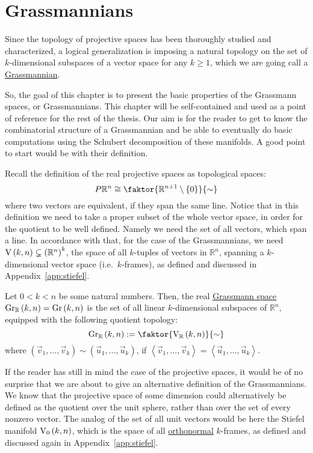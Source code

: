 \chapter{Grassmannians}
Since the topology of projective spaces has been thoroughly studied and characterized, a logical generalization is imposing a natural topology on the set of $k$-dimensional subspaces of a vector space for any $k\geq1$, which we are going call a \ul{Grassmannian}.

So, the goal of this chapter is to present the basic properties of the Grassmann spaces, or Grassmannians. This chapter will be self-contained and used as a point of reference for the rest of the thesis. Our aim is for the reader to get to know the combinatorial structure of a Grassmannian and be able to eventually do basic computations using the Schubert decomposition of these manifolds. A good point to start would be with their definition.

Recall the definition of the real projective spaces as topological spaces:
\[P\mathbb{R}^n\cong\faktor{\mathbb{R}^{n+1}\setminus\{0\}}{\sim}\]
where two vectors are equivalent, if they span the same line. Notice that in this definition we need to take a proper subset of the whole vector space, in order for the quotient to be well defined. Namely we need the set of all vectors, which span a line. In accordance with that, for the case of the Grassmannians, we need $\St{k}{n}\subsetneq{\left(\mathbb{R}^n\right)}^k$, the space of all $k$-tuples of vectors in $\mathbb{R}^n$, spanning a $k$-dimensional vector space (i.e.\ $k$-frames), as defined and discussed in Appendix~\ref{app:stiefel}.

\begin{definition} Let $0<k<n$ be some natural numbers. Then, the real \ul{Grassmann space} $\Gr{k}{n}{\mathbb{R}}=\Gr{k}{n}$ is the set of all linear $k$-dimensional subspaces of $\mathbb{R}^n$, equipped with the following quotient topology:
\[\Gr{k}{n}{\mathbb{R}}:=\faktor{\St{k}{n}{\mathbb{R}}}{\sim}\]
where $(\vec{v}_1,\ldots,\vec{v}_k)\sim(\vec{u}_1,\ldots,\vec{u}_k)$, if $\left<\vec{v}_1,\ldots,\vec{v}_k\right>=\left<\vec{u}_1,\ldots,\vec{u}_k\right>$.
\end{definition}

If the reader has still in mind the case of the projective spaces, it would be of no surprise that we are about to give an alternative definition of the Grassmannians. We know that the projective space of some dimension could alternatively be defined as the quotient over the unit sphere, rather than over the set of every nonzero vector. The analog of the set of all unit vectors would be here the Stiefel manifold $\StO{k}{n}$, which is the space of all \ul{orthonormal} $k$-frames, as defined and discussed again in Appendix~\ref{app:stiefel}.

